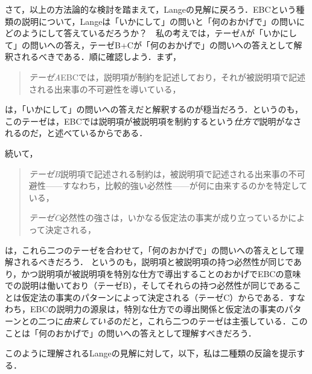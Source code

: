 \documentclass[dvipdfmx,twoside,11pt,uplatex]{jsarticle}
\newcommand{\myterm}[2]{{\emph{#1}}{[\emph{#2}]}}
\theoremstyle{definition}
\begin{document}
さて，以上の方法論的な検討を踏まえて，Langeの見解に戻ろう．EBCという種類の説明について，Langeは「いかにして」の問いと「何のおかげで」の問いにどのようにして答えているだろうか？　私の考えでは，テーゼAが「いかにして」の問いへの答え，テーゼB+Cが「何のおかげで」の問いへの答えとして解釈されるべきである．順に確認しよう．まず，
\begin{quote}
    \emph{テーゼA}\quad EBCでは，説明項が制約を記述しており，それが被説明項で記述される出来事の不可避性を導いている，
\end{quote}
は，「いかにして」の問いへの答えだと解釈するのが穏当だろう．というのも，このテーゼは，EBCでは説明項が被説明項を制約するという\emph{仕方で}説明がなされるのだ，と述べているからである．

続いて，
\begin{quote}
    \emph{テーゼB}\quad 説明項で記述される制約は，被説明項で記述される出来事の不可避性------すなわち，比較的強い必然性------が何に由来するのかを特定している，

    \emph{テーゼC}\quad 必然性の強さは，いかなる仮定法の事実が成り立っているかによって決定される，
\end{quote}
は，これら二つのテーゼを合わせて，「何のおかげで」の問いへの答えとして理解されるべきだろう．
というのも，説明項と被説明項の持つ必然性が同じであり，かつ説明項が被説明項を特別な仕方で導出することのおかげでEBCの意味での説明は働いており（テーゼB），そしてそれらの持つ必然性が同じであることは仮定法の事実のパターンによって決定される（テーゼC）からである．すなわち，EBCの説明力の源泉は，特別な仕方での導出関係と仮定法の事実のパターンとの二つに\emph{由来している}のだと，これら二つのテーゼは主張している．このことは「何のおかげで」の問いへの答えとして理解すべきだろう．

このように理解されるLangeの見解に対して，以下，私は二種類の反論を提示する．
\end{document}
